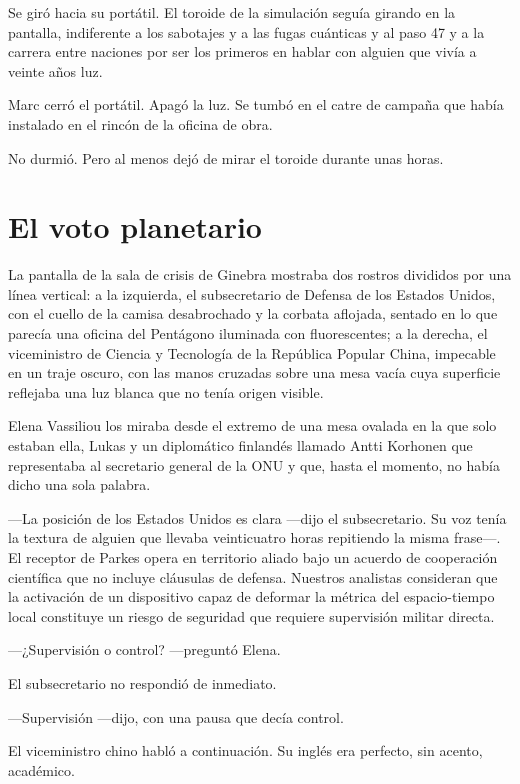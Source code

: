 \documentclass[11pt,a5paper,twoside]{book}
\begin{document}
Se giró hacia su portátil. El toroide de la simulación seguía girando en la pantalla, indiferente a los sabotajes y a las fugas cuánticas y al paso 47 y a la carrera entre naciones por ser los primeros en hablar con alguien que vivía a veinte años luz.

Marc cerró el portátil. Apagó la luz. Se tumbó en el catre de campaña que había instalado en el rincón de la oficina de obra.

No durmió. Pero al menos dejó de mirar el toroide durante unas horas.

\chapter{El voto planetario}

La pantalla de la sala de crisis de Ginebra mostraba dos rostros divididos por una línea vertical: a la izquierda, el subsecretario de Defensa de los Estados Unidos, con el cuello de la camisa desabrochado y la corbata aflojada, sentado en lo que parecía una oficina del Pentágono iluminada con fluorescentes; a la derecha, el viceministro de Ciencia y Tecnología de la República Popular China, impecable en un traje oscuro, con las manos cruzadas sobre una mesa vacía cuya superficie reflejaba una luz blanca que no tenía origen visible.

Elena Vassiliou los miraba desde el extremo de una mesa ovalada en la que solo estaban ella, Lukas y un diplomático finlandés llamado Antti Korhonen que representaba al secretario general de la ONU y que, hasta el momento, no había dicho una sola palabra.

—La posición de los Estados Unidos es clara —dijo el subsecretario. Su voz tenía la textura de alguien que llevaba veinticuatro horas repitiendo la misma frase—. El receptor de Parkes opera en territorio aliado bajo un acuerdo de cooperación científica que no incluye cláusulas de defensa. Nuestros analistas consideran que la activación de un dispositivo capaz de deformar la métrica del espacio-tiempo local constituye un riesgo de seguridad que requiere supervisión militar directa.

—¿Supervisión o control? —preguntó Elena.

El subsecretario no respondió de inmediato.

—Supervisión —dijo, con una pausa que decía control.

El viceministro chino habló a continuación. Su inglés era perfecto, sin acento, académico.
\end{document}
